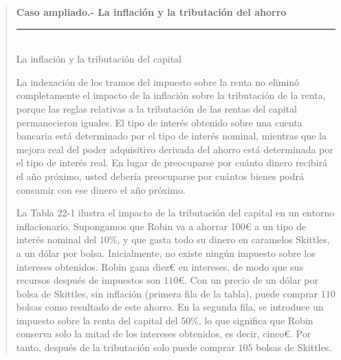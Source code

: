 \documentclass[10pt,a4paper]{article}
\newenvironment{specialblock}[1]{%
      \begin{quote} %
      \small %
      \noindent\textbf{#1}\\[-0.3em] %
      \rule{\linewidth}{0.4pt}\\[0.6em]}{
      \end{quote}}
\begin{document}
\begin{specialblock}{\textbf{Caso ampliado.-} La inflación y la tributación del ahorro}
    La inflación y la tributación del capital
    
    La indexación de los tramos del impuesto sobre la renta no eliminó completamente el impacto de la inflación sobre la tributación de la renta, porque las reglas relativas a la tributación de las rentas del capital permanecieron iguales. El tipo de interés obtenido sobre una cuenta bancaria está determinado por el tipo de interés nominal, mientras que la mejora real del poder adquisitivo derivada del ahorro está determinada por el tipo de interés real. En lugar de preocuparse por cuánto dinero recibirá el año próximo, usted debería preocuparse por cuántos bienes podrá consumir con ese dinero el año próximo.
    
    La Tabla 22-1 ilustra el impacto de la tributación del capital en un entorno inflacionario. Supongamos que Robin va a ahorrar 100€ a un tipo de interés nominal del $10\%$, y que gasta todo su dinero en caramelos Skittles, a un dólar por bolsa. Inicialmente, no existe ningún impuesto sobre los intereses obtenidos. Robin gana diez€ en intereses, de modo que sus recursos después de impuestos son $110€$. Con un precio de un dólar por bolsa de Skittles, sin inflación (primera fila de la tabla), puede comprar $110$ bolsas como resultado de este ahorro. En la segunda fila, se introduce un impuesto sobre la renta del capital del $50\%$, lo que significa que Robin conserva solo la mitad de los intereses obtenidos, es decir, cinco€. Por tanto, después de la tributación solo puede comprar $105$ bolsas de Skittles.
    

\end{specialblock}
\end{document}
